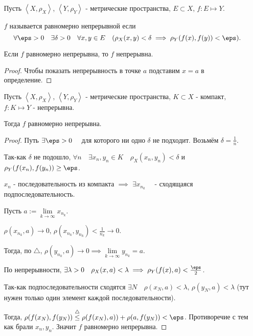 
\begin{definition} \thmslashn 

    Пусть $\left<X, \rho_{X}\right>$, $\left<Y, \rho_{Y}\right>$ - метрические пространства, $E \subset X$, $f : E \mapsto Y$.

    $f$ называется равномерно непрерывной если
    \[ \forall{\eps > 0}\quad \exists{\delta > 0}\quad \forall{x, y\in E}\quad (\rho_{X}(x, y) < \delta \implies \rho_{Y}(f(x), f(y)) < \eps) .\] 
\end{definition}
\begin{lemma} \thmslashn

    Если $f$ равномерно непрерывна, то $f$ непрерывна.
    \begin{proof} \thmslashn
    
        Чтобы показать непрерывность в точке $a$ подставим $x=a$ в определение.
    \end{proof}
\end{lemma}
\begin{theorem}[Кантора] \thmslashn

    Пусть $\left<X, \rho_{X}\right>$, $\left<Y, \rho_{Y}\right>$ - метрические пространства, $K \subset X$ - компакт, $f : K \mapsto Y$ - непрерывна.
    

    Тогда $f$ равномерно непрерывна.
    \begin{proof} \thmslashn
    
        Путь $\exists{\eps > 0}\quad $ для которого ни одно $\delta$ не подходит. Возьмём $\delta = \frac{1}{n}$. 

        Так-как $\delta$ не подошло, $\forall{n}\quad \exists{x_{n}, y_{n}\in K}\quad \rho_{X}(x_{n}, y_{n}) < \delta$ и $\rho_{Y}(f(x_{n}), f(y_{n})) \ge  \eps$.

        $x_{n}$ - последовательность из компакта $\implies$ $\exists{x_{n_{k}}}\quad $ - сходящаяся подпоследовательность.

        Пусть $a := \lim\limits_{k \to \infty} x_{n_{k}}$.

        $\rho(x_{n_{k}}, a) \to 0$, $\rho(x_{n_{k}}, y_{n_{k}}) < \frac{1}{n_{k}} \to 0$.

        Тогда, по $\triangle$, $\rho(y_{n_{k}}, a) \to 0 \implies \lim\limits_{k \to \infty} y_{n_{k}} = a$.

        По непрерывности, $\exists{\lambda > 0}\quad \rho_{X}(x, a) < \lambda \implies \rho_{Y}(f(x), a) < \frac{\eps}{2}$.

        Так-как подпоследовательности сходятся $\exists{N}\quad \rho(x_{N}, a) < \lambda$, $\rho(y_{N}, a) < \lambda$ (тут нужен только один элемент каждой последовательности).

        Тогда, $\rho(f(x_{N}), f(y_{N})) \overset{\triangle}{\le} \rho(f(x_{N}), a)) + \rho(a, f(y_{N})) < \eps$. Противоречие с тем как брали $x_{n}, y_{n}$. Значит $f$ равномерно непрерывна.
    \end{proof}
\end{theorem}
